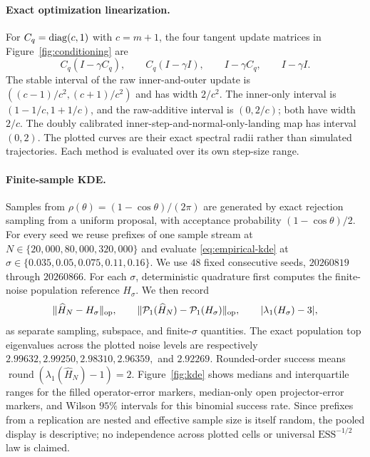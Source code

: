 \paragraph{Exact optimization linearization.}
For $C_q=\operatorname{diag}(c,1)$ with $c=m+1$, the four tangent update matrices in
Figure~\ref{fig:conditioning} are
\[
  C_q(I-\gamma C_q),\qquad C_q(I-\gamma I),\qquad
  I-\gamma C_q,\qquad I-\gamma I.
\]
The stable interval of the raw inner-and-outer update is
$((c-1)/c^2,(c+1)/c^2)$ and has width $2/c^2$.  The inner-only interval is
$(1-1/c,1+1/c)$, and the raw-additive interval is $(0,2/c)$; both have width
$2/c$.  The doubly calibrated inner-step-and-normal-only-landing map has
interval $(0,2)$.  The plotted curves are
their exact spectral radii rather than simulated trajectories.  Each method
is evaluated over its own step-size range.

\paragraph{Finite-sample KDE.}
Samples from $\rho(\theta)=(1-\cos\theta)/(2\pi)$ are generated by exact rejection sampling from a uniform proposal, with acceptance probability $(1-\cos\theta)/2$.  For every seed we reuse prefixes of one sample stream at
$N\in\{20{,}000,80{,}000,320{,}000\}$ and evaluate \eqref{eq:empirical-kde} at
$\sigma\in\{0.035,0.05,0.075,0.11,0.16\}$.  We use $48$ fixed consecutive seeds,
$20260819$ through $20260866$.  For each $\sigma$, deterministic quadrature
first computes the finite-noise population reference $H_\sigma$.  We then record
\[
  \|\widehat H_N-H_\sigma\|_{\mathrm{op}},\qquad
  \|\mathcal P_1(\widehat H_N)-\mathcal P_1(H_\sigma)\|_{\mathrm{op}},\qquad
  |\lambda_1(H_\sigma)-3|,
\]
as separate sampling, subspace, and finite-$\sigma$ quantities.  The exact
population top eigenvalues across the plotted noise levels are respectively
$2.99632,2.99250,2.98310,2.96359,$ and $2.92269$.  Rounded-order success means
$\operatorname{round}(\lambda_1(\widehat H_N)-1)=2$.  Figure~\ref{fig:kde}
shows medians and interquartile ranges for the filled operator-error markers,
median-only open projector-error markers, and Wilson $95\%$ intervals for this
binomial success rate.  Since prefixes from a replication
are nested and effective sample size is itself random, the pooled display is
descriptive; no independence across plotted cells or universal
$\mathrm{ESS}^{-1/2}$ law is claimed.

